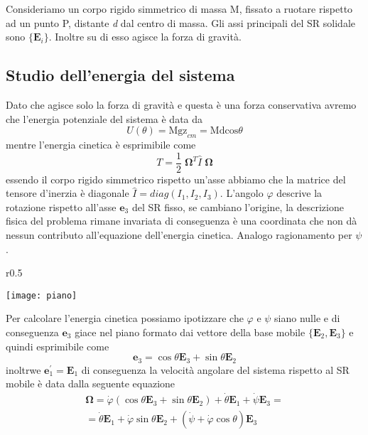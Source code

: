Consideriamo un corpo rigido simmetrico di massa M, fissato a ruotare rispetto ad un punto P, distante \textit{d} dal centro di massa. Gli assi principali del SR solidale sono $\{\bm{E}_i\}$. Inoltre su di esso agisce la forza di gravit\`{a}. 

\subsection{Studio dell'energia del sistema}
Dato che agisce solo la forza di gravit\`{a} e questa \`{e} una forza conservativa avremo che l'energia potenziale del sistema \`{e} data da 
\begin{equation}
	U(\theta) = \text{Mgz}_{cm} = \text{Mdcos}\theta
\end{equation}
mentre l'energia cinetica \`{e} esprimibile come 
\begin{equation}
	T = \frac{1}{2}\;\bm{\Omega}^{T}\hat{I}\;\bm{\Omega}
\end{equation}
essendo il corpo rigido simmetrico rispetto un'asse abbiamo che la matrice del tensore d'inerzia \`{e} diagonale $\hat{I} = diag(I_1,I_2,I_3)$. \newline
L'angolo $\varphi$ descrive la rotazione rispetto all'asse $\bm{e}_{3}$ del SR fisso, se cambiano l'origine, la descrizione fisica del problema rimane invariata di conseguenza \`{e} una coordinata che non d\`{a} nessun contributo all'equazione dell'energia cinetica. Analogo ragionamento per $\psi$. \newline
\begin{wrapfigure}{r}{0.5\textwidth}
\vspace{-1.4cm}
  \begin{center}
    \texttt{[image: piano]}
    \end{center}
\end{wrapfigure}
Per calcolare l'energia cinetica possiamo ipotizzare che $\varphi$ e $\psi$ siano nulle e di conseguenza $\bm{e}_{3}$ giace nel piano formato dai vettore della base mobile $\{\bm{E}_2,\bm{E}_{3}\}$ e quindi esprimibile come 
\begin{equation}
	\bm{e}_{3} = \cos\theta \bm{E}_{3} + \sin \theta \bm{E}_{2}
\end{equation}
inoltrwe $\bm{e}_{1}^{\prime} = \bm{E}_{1}$ di conseguenza la velocit\`{a} angolare del sistema rispetto al SR mobile \`{e} data dalla seguente equazione 
\begin{equation}
\begin{aligned}
	& \bm{\Omega} = \dot{\varphi} \left ( \cos\theta \bm{E}_{3} + \sin \theta \bm{E}_{2} \right ) + \dot{\theta} \bm{E}_{1} + \dot{\psi}\bm{E}_{3} = & \\[0.15in]
	& = \dot{\theta} \bm{E}_{1} + \dot{\varphi}\sin \theta \bm{E}_{2} + \left ( \dot{\psi} + \dot{\varphi} \cos\theta\right )\bm{E}_{3}
\end{aligned}
\end{equation}
